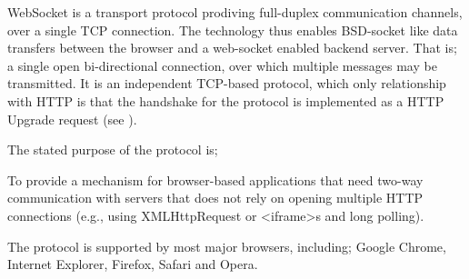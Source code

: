 WebSocket is a transport protocol prodiving full-duplex communication channels,
over a single TCP connection. The technology thus enables BSD-socket like data
transfers between the browser and a web-socket enabled backend server. That is;
a single open bi-directional connection, over which multiple messages may be
transmitted.
\newline\newline
It is an independent TCP-based protocol, which only relationship with HTTP is
that the handshake for the protocol is implemented as a HTTP Upgrade request
(see \citep{RFC6455}).

The stated purpose of the protocol is;
\begin{displayquote}
To provide a mechanism for browser-based applications that need two-way
communication with servers that does not rely on opening multiple HTTP
connections (e.g., using XMLHttpRequest or <iframe>s and long polling).
\end{displayquote}
The protocol is supported by most major browsers, including; Google Chrome,
Internet Explorer, Firefox, Safari and Opera. 
